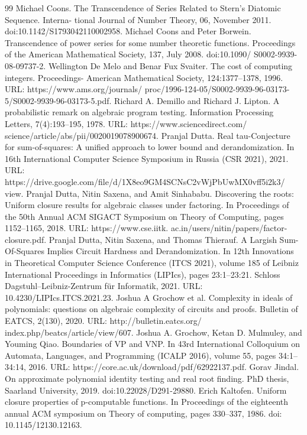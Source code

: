 \begin{thebibliography}{99}
 Michael Coons. The Transcendence of Series Related to Stern’s Diatomic Sequence. Interna- tional Journal of Number Theory, 06, November 2011. doi:10.1142/S1793042110002958.
 Michael Coons and Peter Borwein. Transcendence of power series for some number theoretic functions. Proceedings of the American Mathematical Society, 137, July 2008. doi:10.1090/ S0002-9939-08-09737-2.
 Wellington De Melo and Benar Fux Svaiter. The cost of computing integers. Proceedings- American Mathematical Society, 124:1377–1378, 1996. URL: https://www.ams.org/journals/ proc/1996-124-05/S0002-9939-96-03173-5/S0002-9939-96-03173-5.pdf.
 Richard A. Demillo and Richard J. Lipton. A probabilistic remark on algebraic program testing. Information Processing Letters, 7(4):193–195, 1978. URL: https://www.sciencedirect.com/ science/article/abs/pii/0020019078900674.
 Pranjal Dutta. Real tau-Conjecture for sum-of-squares: A unified approach to lower bound and derandomization. In 16th International Computer Science Symposium in Russia (CSR 2021), 2021. URL: https://drive.google.com/file/d/1X8eo9GM4SCNsC2vWjPbUwMX0vff5i2k3/ view.
 Pranjal Dutta, Nitin Saxena, and Amit Sinhababu. Discovering the roots: Uniform closure results for algebraic classes under factoring. In Proceedings of the 50th Annual ACM SIGACT Symposium on Theory of Computing, pages 1152–1165, 2018. URL: https://www.cse.iitk. ac.in/users/nitin/papers/factor-closure.pdf.
 Pranjal Dutta, Nitin Saxena, and Thomas Thierauf. A Largish Sum-Of-Squares Implies Circuit Hardness and Derandomization. In 12th Innovations in Theoretical Computer Science Conference (ITCS 2021), volume 185 of Leibniz International Proceedings in Informatics (LIPIcs), pages 23:1–23:21. Schloss Dagstuhl–Leibniz-Zentrum für Informatik, 2021. URL: 10.4230/LIPIcs.ITCS.2021.23.
 Joshua A Grochow et al. Complexity in ideals of polynomials: questions on algebraic complexity of circuits and proofs. Bulletin of EATCS, 2(130), 2020. URL: http://bulletin.eatcs.org/ index.php/beatcs/article/view/607.
 Joshua A. Grochow, Ketan D. Mulmuley, and Youming Qiao. Boundaries of VP and VNP. In 43rd International Colloquium on Automata, Languages, and Programming (ICALP 2016), volume 55, pages 34:1–34:14, 2016. URL: https://core.ac.uk/download/pdf/62922137.pdf.
 Gorav Jindal. On approximate polynomial identity testing and real root finding. PhD thesis, Saarland University, 2019. doi:10.22028/D291-29880.
 Erich Kaltofen. Uniform closure properties of p-computable functions. In Proceedings of the eighteenth annual ACM symposium on Theory of computing, pages 330–337, 1986. doi: 10.1145/12130.12163.

\end{thebibliography}
